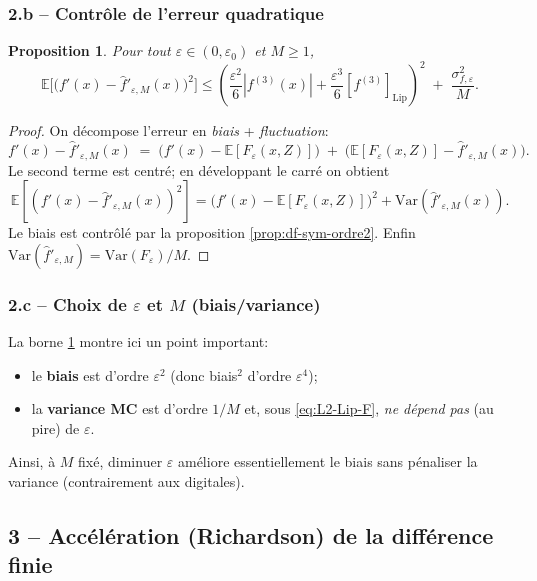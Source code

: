 \documentclass[11pt,a4paper]{article}
\newcommand{\E}{\mathbb{E}}
\newcommand{\1}{\mathbbm{1}}
\newcommand{\Lip}{\mathrm{Lip}}
\newcommand{\Var}{\mathrm{Var}}
\theoremstyle{plain}
\newtheorem{proposition}{Proposition}
\theoremstyle{definition}
\begin{document}
\subsubsection{2.b -- Contrôle de l'erreur quadratique}
\begin{proposition}\label{prop:mse-df-2011}
Pour tout $\varepsilon\in(0,\varepsilon_0)$ et $M\ge 1$,
\[
\E\Big[\big(f'(x)-\widehat f'_{\varepsilon,M}(x)\big)^2\Big]
\le
\left(\frac{\varepsilon^2}{6}|f^{(3)}(x)|+\frac{\varepsilon^3}{6}[f^{(3)}]_{\Lip}\right)^2
\;+\;\frac{\sigma_{f,\varepsilon}^2}{M}.
\]
\end{proposition}
\begin{proof}
On décompose l'erreur en \emph{biais} + \emph{fluctuation}:
\[
f'(x)-\widehat f'_{\varepsilon,M}(x)
\;=\;\Big(f'(x)-\E[F_\varepsilon(x,Z)]\Big)\;+\;\Big(\E[F_\varepsilon(x,Z)]-\widehat f'_{\varepsilon,M}(x)\Big).
\]
Le second terme est centré; en développant le carré on obtient
\[
\E[(f'(x)-\widehat f'_{\varepsilon,M}(x))^2]
=\big(f'(x)-\E[F_\varepsilon(x,Z)]\big)^2+\Var(\widehat f'_{\varepsilon,M}(x)).
\]
Le biais est contrôlé par la proposition \ref{prop:df-sym-ordre2}. Enfin
$\Var(\widehat f'_{\varepsilon,M})=\Var(F_\varepsilon)/M$.
\end{proof}

\subsubsection{2.c -- Choix de $\varepsilon$ et $M$ (biais/variance)}
La borne \ref{prop:mse-df-2011} montre ici un point important:
\begin{itemize}[leftmargin=*]
  \item le \textbf{biais} est d'ordre $\varepsilon^2$ (donc biais$^2$ d'ordre $\varepsilon^4$);
  \item la \textbf{variance MC} est d'ordre $1/M$ et, sous \eqref{eq:L2-Lip-F}, \emph{ne dépend pas} (au pire) de $\varepsilon$.
\end{itemize}
Ainsi, à $M$ fixé, diminuer $\varepsilon$ améliore essentiellement le biais sans pénaliser la variance (contrairement aux digitales).

\subsection{3 -- Accélération (Richardson) de la différence finie}
\end{document}
